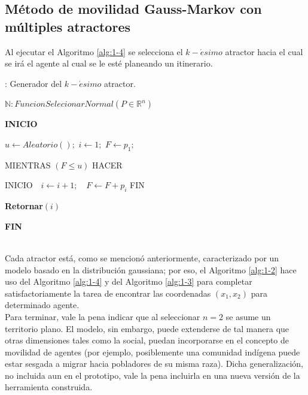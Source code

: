 \subsection{Método de movilidad Gauss-Markov con múltiples atractores}
Al ejecutar el Algoritmo \ref{alg:1-4} se selecciona el $k-\acute{e}simo$  atractor hacia el cual se irá el agente al cual se le esté planeando un itinerario.
\begin{algorithm}
    \caption{: Generador del  $k-\acute{e}simo$ atractor.}
    \label{alg:1-4}
    \textbf{$\mathbb{N}:FuncionSelecionarNormal\left(P\in\mathbb{R}^n\right)$}
    \begin{flushleft}
    \textbf{INICIO}\\
    \end{flushleft}
    
    \begin{algorithmic}
    
    
    \State $u\gets Aleatorio\left(\right);$
    \State $i\gets1;$
    \State $F\gets p_1;$
    \begin{flushleft}
    MIENTRAS $(F\le u)$ HACER
    \end{flushleft}
    \begin{algorithmic}
     \State INICIO
     \State $\:\:\:i\gets i+1;$
     \State $\:\:\:F\gets F+p_i$
     \State FIN
    \end{algorithmic}
   
    \begin{flushleft}
    \textbf{Retornar$(i)$}
    \end{flushleft}
    
       
    \end{algorithmic}
    \begin{flushleft}
    \textbf{FIN}
    \end{flushleft}
\end{algorithm}
\\
Cada atractor está, como se mencionó anteriormente, caracterizado por un modelo basado en la distribución gaussiana; por eso, el Algoritmo \ref{alg:1-2} hace uso del Algoritmo \ref{alg:1-4} y del Algoritmo \ref{alg:1-3} para completar satisfactoriamente la tarea de encontrar las coordenadas  $(x_1,x_2)$ para determinado agente.\\
Para terminar, vale la pena indicar que al seleccionar  $n=2$ se asume un territorio plano.  El modelo, sin embargo, puede extenderse de tal manera que otras dimensiones tales como la social, puedan incorporarse en el concepto de movilidad de agentes (por ejemplo, posiblemente una comunidad indígena puede estar sesgada a migrar hacia pobladores de su misma raza).  Dicha generalización, no incluida aun en el prototipo, vale la pena incluirla en una nueva versión de la herramienta construida.


